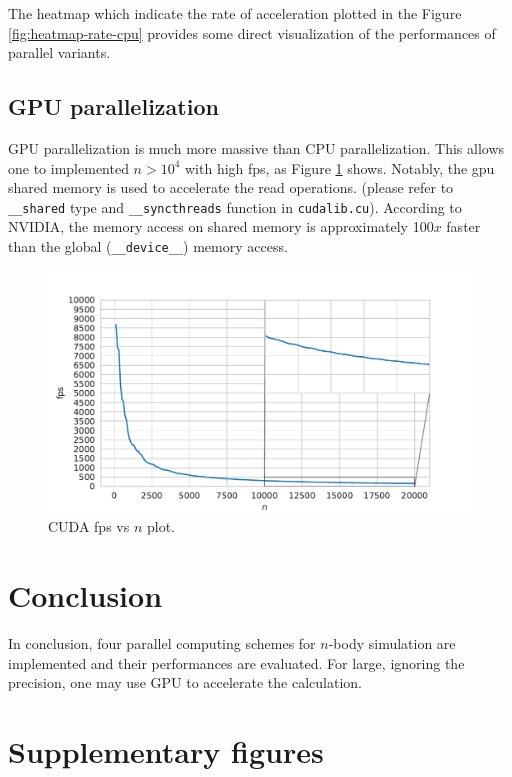 \documentclass[twoside,12pt]{article}
\theoremstyle{definition}
\theoremstyle{remark}
\begin{document}
The heatmap which indicate the rate of acceleration plotted in the Figure \ref{fig:heatmap-rate-cpu} 
provides some direct visualization of the performances of parallel variants.


\subsection{GPU parallelization}
GPU parallelization is much more massive than CPU parallelization.
This allows one to implemented $n>10^4$ with high fps, as Figure \ref{fig:fps-dim-gpu}
shows.
Notably, the gpu shared memory is used to accelerate the read operations.
(please refer to \lstinline|__shared| type and \lstinline|__syncthreads| function
in \lstinline|cudalib.cu|).
According to NVIDIA, the memory access on shared memory is
approximately 100$x$ faster than the global (\lstinline|__device__|) memory access.

\begin{figure}[t!]
    \centering
    \includegraphics[width=\textwidth]{../analysis/fps-dim-gpu.pdf}
    \caption{CUDA fps vs $n$ plot.}
    \label{fig:fps-dim-gpu}
\end{figure}


\section{Conclusion}
In conclusion, four parallel computing schemes for $n$-body simulation 
are implemented and their performances are evaluated.
For large, ignoring the precision, one may use GPU to accelerate
the calculation.


\appendix

\newpage
\section{Supplementary figures}
\end{document}
